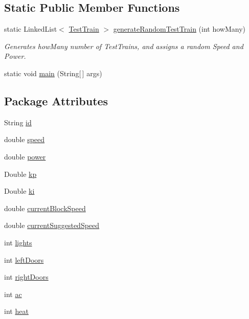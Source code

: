 \subsection*{Static Public Member Functions}
\begin{DoxyCompactItemize}
\item 
static Linked\+List$<$ \hyperlink{classTrainControllerComps_1_1TestTrain}{Test\+Train} $>$ \hyperlink{classTrainControllerComps_1_1TestTrain_a9ac49f75c523af590e04e6feec2b2b0d}{generate\+Random\+Test\+Train} (int how\+Many)
\begin{DoxyCompactList}\small\item\em Generates \textquotesingle{}how\+Many\textquotesingle{} number of Test\+Trains, and assigns a random Speed and Power. \end{DoxyCompactList}\item 
static void \hyperlink{classTrainControllerComps_1_1TestTrain_abcd04903f3a72e1cc2c667edfc3930ec}{main} (String\mbox{[}$\,$\mbox{]} args)
\end{DoxyCompactItemize}
\subsection*{Package Attributes}
\begin{DoxyCompactItemize}
\item 
String \hyperlink{classTrainControllerComps_1_1TestTrain_a9e1acb4fe54e1d3cebdbf45aa70c74b3}{id}
\item 
double \hyperlink{classTrainControllerComps_1_1TestTrain_a9904816560b86c2fc9a9c9674139e37d}{speed}
\item 
double \hyperlink{classTrainControllerComps_1_1TestTrain_a8416b4c7dced6baaf6437737d6442401}{power}
\item 
Double \hyperlink{classTrainControllerComps_1_1TestTrain_a89626f4debafbbd7bedf7832bec55711}{kp}
\item 
Double \hyperlink{classTrainControllerComps_1_1TestTrain_acfaf0a5760dbfcaaa6b19a5f950df7d4}{ki}
\item 
double \hyperlink{classTrainControllerComps_1_1TestTrain_a759a319845a8467052c55f38e15a10c3}{current\+Block\+Speed}
\item 
double \hyperlink{classTrainControllerComps_1_1TestTrain_aff2417885f562dc95f9ecff931a49180}{current\+Suggested\+Speed}
\item 
int \hyperlink{classTrainControllerComps_1_1TestTrain_ab04e07e68d782f16a352d6034baab648}{lights}
\item 
int \hyperlink{classTrainControllerComps_1_1TestTrain_a7b99e5d746f86203da443ad7bcc8bbde}{left\+Doors}
\item 
int \hyperlink{classTrainControllerComps_1_1TestTrain_a87496df76f82b4f0736afdcd60b42e0e}{right\+Doors}
\item 
int \hyperlink{classTrainControllerComps_1_1TestTrain_a65cb0b4b1944821c9b71f53167a57ec7}{ac}
\item 
int \hyperlink{classTrainControllerComps_1_1TestTrain_a31ee8bfd0d2b333df692583a26eed6a5}{heat}
\end{DoxyCompactItemize}


